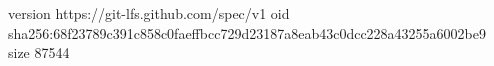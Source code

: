 version https://git-lfs.github.com/spec/v1
oid sha256:68f23789c391c858c0faeffbcc729d23187a8eab43c0dcc228a43255a6002be9
size 87544
